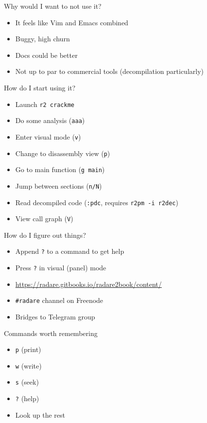 \documentclass[presentation]{beamer}
\begin{document}
\begin{frame}[label={sec:orgf910c5b}]{Why would I want to not use it?}
\begin{itemize}
\item It feels like Vim and Emacs combined
\item Buggy, high churn
\item Docs could be better
\item Not up to par to commercial tools (decompilation particularly)
\end{itemize}
\end{frame}

\begin{frame}[fragile,label={sec:orgda99b00}]{How do I start using it?}
 \begin{itemize}
\item Launch \texttt{r2 crackme}
\item Do some analysis (\texttt{aaa})
\item Enter visual mode (\texttt{v})
\item Change to disassembly view (\texttt{p})
\item Go to main function (\texttt{g main})
\item Jump between sections (\texttt{n/N})
\item Read decompiled code (\texttt{:pdc}, requires \texttt{r2pm -i r2dec})
\item View call graph (\texttt{V})
\end{itemize}
\end{frame}

\begin{frame}[fragile,label={sec:orgdb5e493}]{How do I figure out things?}
 \begin{itemize}
\item Append \texttt{?} to a command to get help
\item Press \texttt{?} in visual (panel) mode
\item \url{https://radare.gitbooks.io/radare2book/content/}
\item \texttt{\#radare} channel on Freenode
\item Bridges to Telegram group
\end{itemize}
\end{frame}

\begin{frame}[fragile,label={sec:org4268ed9}]{Commands worth remembering}
 \begin{itemize}
\item \texttt{p} (print)
\item \texttt{w} (write)
\item \texttt{s} (seek)
\item \texttt{?} (help)
\item Look up the rest
\end{itemize}
\end{frame}
\end{document}
